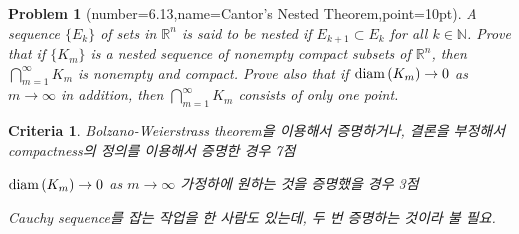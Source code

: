\documentclass[oldfontcommands]{oblivoir}%
\newtheorem{problem}{Problem}[.exercise_box]
\newtheorem*{criteria}{Criteria}
\begin{document}
 \begin{problem}[number=6.13,name=Cantor's Nested Theorem,point=10pt]
 A sequence $\{E_k \}$ of sets in $\mathbb{R}^n$ is said to be {\it nested} if $E_{k+1} \subset E_k$ for all $k\in \mathbb{N}$. Prove that if $\{K_m\}$ is a nested sequence  of nonempty compact subsets of $\mathbb{R}^n$, then  $\bigcap_{m=1}^\infty K_m$ is nonempty and compact.
 Prove also that  if ${\rm diam}\, (K_m ) \to 0$ as $m \to \infty$ in addition, then  $\bigcap_{m=1}^\infty K_m$ consists of only one point.
 \end{problem}
 \begin{criteria}\label{test}
 Bolzano-Weierstrass theorem을 이용해서 증명하거나, 결론을 부정해서 compactness의 정의를 이용해서 증명한 경우 7점
 
 ${\rm diam}\, (K_m ) \to 0$ as $m \to \infty$ 가정하에 원하는 것을 증명했을 경우 3점
 
 Cauchy sequence를 잡는 작업을 한 사람도 있는데, 두 번 증명하는 것이라 불 필요. 
  \end{criteria}
   
 
\end{document}
